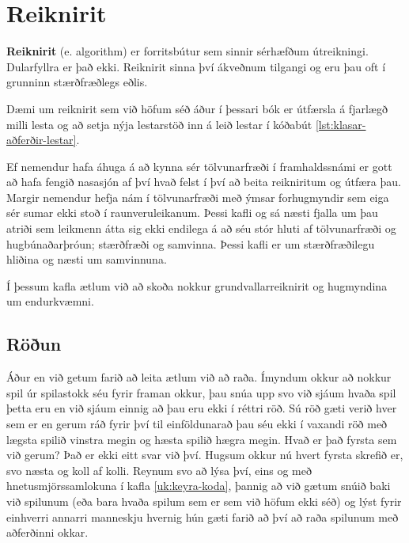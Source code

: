 
\chapter{Reiknirit}\label{k:reiknirit}
\textbf{Reiknirit} (e. algorithm) er forritsbútur sem sinnir sérhæfðum útreikningi.
Dularfyllra er það ekki.
Reiknirit sinna því ákveðnum tilgangi og eru þau oft í grunninn stærðfræðlegs eðlis.

Dæmi um reiknirit sem við höfum séð áður í þessari bók er útfærsla á fjarlægð milli lesta og að setja nýja lestarstöð inn á leið lestar í kóðabút \ref{lst:klasar-aðferðir-lestar}.

Ef nemendur hafa áhuga á að kynna sér tölvunarfræði í framhaldssnámi er gott að hafa fengið nasasjón af því hvað felst í því að beita reikniritum og útfæra þau.
Margir nemendur hefja nám í tölvunarfræði með ýmsar forhugmyndir sem eiga sér sumar ekki stoð í raunveruleikanum.
Þessi kafli og sá næsti fjalla um þau atriði sem leikmenn átta sig ekki endilega á að séu stór hluti af tölvunarfræði og hugbúnaðarþróun; stærðfræði og samvinna.
Þessi kafli er um stærðfræðilegu hliðina og næsti um samvinnuna.

Í þessum kafla ætlum við að skoða nokkur grundvallarreiknirit og hugmyndina um endurkvæmni.





\section{Röðun}\label{uk:reiknirit-röðun}
Áður en við getum farið að leita ætlum við að raða.
Ímyndum okkur að nokkur spil úr spilastokk séu fyrir framan okkur, þau snúa upp svo við sjáum hvaða spil þetta eru en við sjáum einnig að þau eru ekki í réttri röð.
Sú röð gæti verið hver sem er en gerum ráð fyrir því til einföldunarað þau séu ekki í vaxandi röð með lægsta spilið vinstra megin og hæsta spilið hægra megin.
Hvað er það fyrsta sem við gerum?
Það er ekki eitt svar við því.
Hugsum okkur nú hvert fyrsta skrefið er, svo næsta og koll af kolli.
Reynum svo að lýsa því, eins og með hnetusmjörssamlokuna í kafla \ref{uk:keyra-koda}, þannig að við gætum snúið baki við spilunum (eða bara hvaða spilum sem er sem við höfum ekki séð) og lýst fyrir einhverri annarri manneskju hvernig hún gæti farið að því að raða spilunum með aðferðinni okkar.

